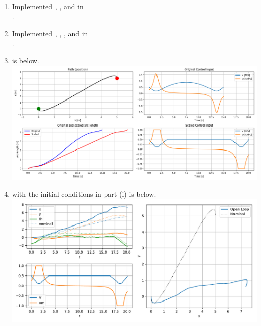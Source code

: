 \documentclass{article}
\begin{document}
\begin{enumerate}[label=(\roman*)]
\item Implemented , , and  in \\ .

\item Implemented , , , and  in \\ .

\item {} is below. \\ \includegraphics[scale=0.375]{plots/differential_flatness.png}

\item {} with the initial conditions in part (i) is below. \\ \includegraphics[scale=0.565]{plots/sim_traj_openloop.pdf}

\end{enumerate}

\newpage
\end{document}
